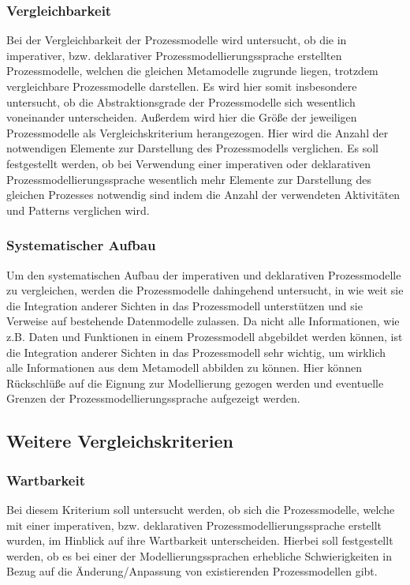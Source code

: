 \subsubsection{Vergleichbarkeit}
Bei der Vergleichbarkeit der Prozessmodelle wird untersucht, ob die in imperativer, bzw. deklarativer Prozessmodellierungssprache erstellten Prozessmodelle, welchen die gleichen Metamodelle zugrunde liegen, trotzdem vergleichbare Prozessmodelle darstellen. Es wird hier somit insbesondere untersucht, ob die Abstraktionsgrade der Prozessmodelle sich wesentlich voneinander unterscheiden. Außerdem wird hier die Größe der jeweiligen Prozessmodelle als Vergleichskriterium herangezogen. Hier wird die Anzahl der notwendigen Elemente zur Darstellung des Prozessmodells verglichen. Es soll festgestellt werden, ob bei Verwendung einer imperativen oder deklarativen Prozessmodellierungssprache wesentlich mehr Elemente zur Darstellung des gleichen Prozesses notwendig sind indem die Anzahl der verwendeten Aktivitäten und Patterns verglichen wird.


\subsubsection{Systematischer Aufbau}
Um den systematischen Aufbau der imperativen und deklarativen Prozessmodelle zu vergleichen, werden die Prozessmodelle dahingehend untersucht, in wie weit sie die Integration anderer Sichten in das Prozessmodell unterstützen und sie Verweise auf bestehende Datenmodelle zulassen. Da nicht alle Informationen, wie z.B. Daten und Funktionen in einem Prozessmodell abgebildet werden können, ist die Integration anderer Sichten in das Prozessmodell sehr wichtig, um wirklich alle Informationen aus dem Metamodell abbilden zu können. Hier können Rückschlüße auf die Eignung zur Modellierung gezogen werden und eventuelle Grenzen der Prozessmodellierungssprache aufgezeigt werden.

\subsection{Weitere Vergleichskriterien}

\subsubsection{Wartbarkeit}

Bei diesem Kriterium soll untersucht werden, ob sich die Prozessmodelle, welche mit einer imperativen, bzw. deklarativen Prozessmodellierungssprache erstellt wurden, im Hinblick auf ihre Wartbarkeit unterscheiden. Hierbei soll festgestellt werden, ob es bei einer der Modellierungssprachen erhebliche Schwierigkeiten in Bezug auf die Änderung/Anpassung von existierenden Prozessmodellen gibt.










